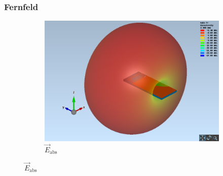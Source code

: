\subsubsection{Fernfeld}
\begin{figure}[h!]
	\centering
	\begin{subfigure}[b]{0.96\textwidth}
		\includegraphics[width=1\textwidth]{../fig/plt/crazy_stuff_l2_3d_eabs.png}
		\caption{$\vec{E}_{\mathrm{abs}}$}
	\end{subfigure}


\end{figure}
